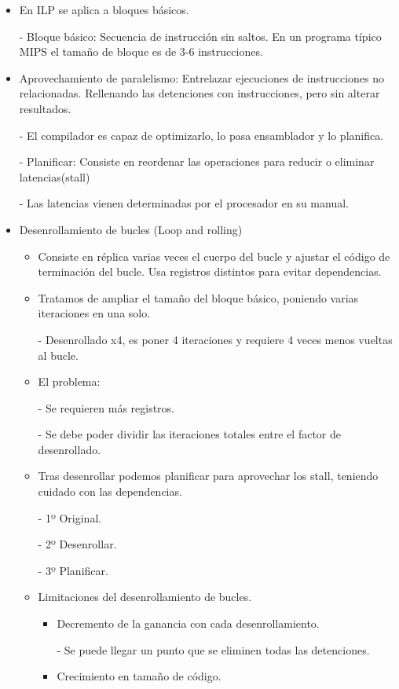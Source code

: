 \documentclass[12pt, twoside, openright]{report} %
\begin{document}
\begin{itemize}
\item En ILP se aplica a bloques básicos.
    
    - Bloque básico: Secuencia de instrucción sin saltos. En un programa típico MIPS el tamaño de bloque es de 3-6 instrucciones.
\item Aprovechamiento de paralelismo: Entrelazar ejecuciones de instrucciones no relacionadas. Rellenando las detenciones con instrucciones, pero sin alterar resultados.
   
    - El compilador es capaz de optimizarlo, lo pasa ensamblador y lo planifica.
    
    - Planificar: Consiste en reordenar las operaciones para reducir o eliminar latencias(stall)
    
    - Las latencias vienen determinadas por el procesador en su manual.
\item Desenrollamiento de bucles (Loop and rolling)
\begin{itemize}
  \item Consiste en réplica varias veces el cuerpo del bucle y ajustar el código de terminación del bucle. Usa registros distintos para evitar dependencias.
  \item Tratamos de ampliar el tamaño del bloque básico, poniendo varias iteraciones en una solo.
  
      - Desenrollado x4, es poner 4 iteraciones y requiere 4 veces menos vueltas al bucle.
  \item El problema:
  
      - Se requieren más registros.

      - Se debe poder dividir las iteraciones totales entre el factor de desenrollado.
  \item Tras desenrollar podemos planificar para aprovechar los stall, teniendo cuidado con las dependencias.
  
      - 1º Original.

      - 2º Desenrollar.

      - 3º Planificar.
  \item Limitaciones del desenrollamiento de bucles.
  \begin{itemize}
    \item Decremento de la ganancia con cada desenrollamiento.
    
    - Se puede llegar un punto que se eliminen todas las detenciones.
    \item Crecimiento en tamaño de código.
    

\end{itemize}
\end{itemize}
\end{itemize}
\end{document}
